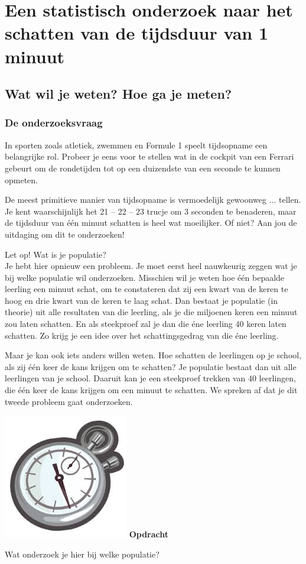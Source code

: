 \documentclass[12pt,twoside]{article}
\newcounter{nstopdracht}
\newenvironment{stopdracht}
{
  \stepcounter{nstopdracht}
  \vspace*{-0.25cm}
  \begin{minipage}{\textwidth}
  {%
  \hspace*{-0.85\marginparwidth}\includegraphics[width=0.75\marginparwidth]{stopwatch}
  \large\bf Opdracht \arabic{nstopdracht}}
}{%
  \end{minipage}
}
\begin{document}
\section{Een statistisch onderzoek naar het schatten van de tijdsduur van 1 minuut}

\subsection{Wat wil je weten? Hoe ga je meten?}

\subsubsection{De onderzoeksvraag}

In sporten zoals atletiek, zwemmen en Formule 1 speelt tijdsopname een belangrijke rol. Probeer je
eens voor te stellen wat in de cockpit van een Ferrari gebeurt om de rondetijden tot op een duizendste
van een seconde te kunnen opmeten.

De meest primitieve manier van tijdsopname is vermoedelijk gewoonweg ... tellen. Je kent
waarschijnlijk het 21 – 22 – 23 trucje om 3 seconden te benaderen, maar de tijdsduur van één minuut
schatten is heel wat moeilijker. Of niet? Aan jou de uitdaging om dit te onderzoeken!

Let op! Wat is je populatie?\\
Je hebt hier opnieuw een probleem. Je moet eerst heel nauwkeurig zeggen wat je bij welke populatie
wil onderzoeken. Misschien wil je weten hoe één bepaalde leerling een minuut schat, om te
constateren dat zij een kwart van de keren te hoog en drie kwart van de keren te laag schat. Dan
bestaat je populatie (in theorie) uit alle resultaten van die leerling, als je die miljoenen keren een
minuut zou laten schatten. En als steekproef zal je dan die éne leerling 40
keren laten schatten. Zo krijg je een idee over het schattingsgedrag van die
éne leerling.

Maar je kan ook iets anders willen weten. Hoe schatten de leerlingen op je
school, als zij één keer de kans krijgen om te schatten? Je populatie bestaat
dan uit alle leerlingen van je school. Daaruit kan je een steekproef trekken
van 40 leerlingen, die één keer de kans krijgen om een minuut te schatten.
We spreken af dat je dit tweede probleem gaat onderzoeken.

\begin{stopdracht}
Wat onderzoek je hier bij welke populatie?
\end{stopdracht}
\end{document}
